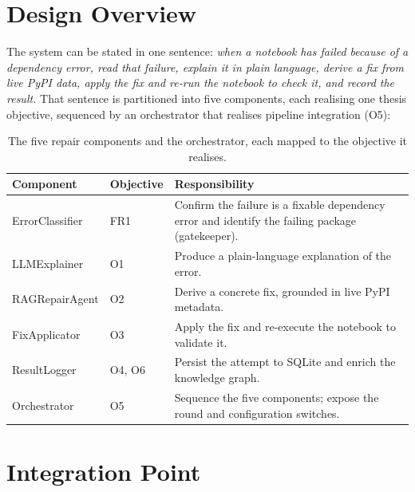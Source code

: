 \section{Design Overview}
\label{sec:design-overview}

The system can be stated in one sentence: \emph{when a notebook has
failed because of a dependency error, read that failure, explain it in
plain language, derive a fix from live PyPI data, apply the fix and
re-run the notebook to check it, and record the result.} That sentence
is partitioned into five components, each realising one thesis
objective, sequenced by an orchestrator that realises pipeline
integration (O5):

\begin{table}[t]
  \centering
  \begin{tabular}{|l|l|p{7.2cm}|}
    \hline
    \textbf{Component} & \textbf{Objective} & \textbf{Responsibility} \\
    \hline
    ErrorClassifier  & FR1     & Confirm the failure is a fixable dependency error and identify the failing package (gatekeeper). \\
    \hline
    LLMExplainer     & O1      & Produce a plain-language explanation of the error. \\
    \hline
    RAGRepairAgent   & O2      & Derive a concrete fix, grounded in live PyPI metadata. \\
    \hline
    FixApplicator    & O3      & Apply the fix and re-execute the notebook to validate it. \\
    \hline
    ResultLogger     & O4, O6  & Persist the attempt to SQLite and enrich the knowledge graph. \\
    \hline
    Orchestrator     & O5      & Sequence the five components; expose the round and configuration switches. \\
    \hline
  \end{tabular}
  \caption{The five repair components and the orchestrator, each mapped
           to the objective it realises.}
  \label{tab:components-objectives}
\end{table}

\section{Integration Point}
\label{sec:integration-point}

